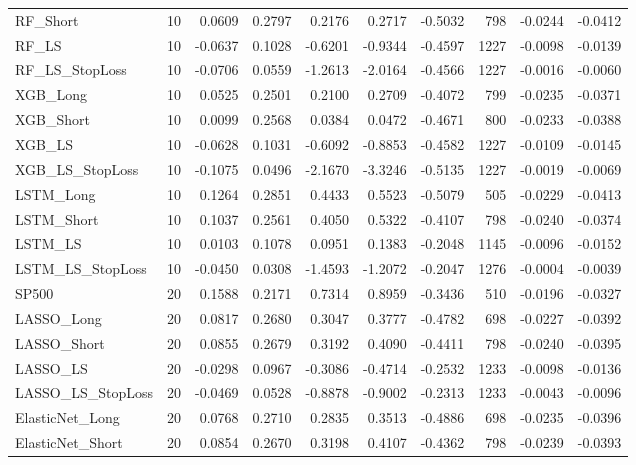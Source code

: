 \begin{tabular}{llrrrrrrrr}
\cline{1-10}
RF\_Short & 10 & 0.0609 & 0.2797 & 0.2176 & 0.2717 & -0.5032 & 798 & -0.0244 & -0.0412 \\
\cline{1-10}
RF\_LS & 10 & -0.0637 & 0.1028 & -0.6201 & -0.9344 & -0.4597 & 1227 & -0.0098 & -0.0139 \\
\cline{1-10}
RF\_LS\_StopLoss & 10 & -0.0706 & 0.0559 & -1.2613 & -2.0164 & -0.4566 & 1227 & -0.0016 & -0.0060 \\
\cline{1-10}
XGB\_Long & 10 & 0.0525 & 0.2501 & 0.2100 & 0.2709 & -0.4072 & 799 & -0.0235 & -0.0371 \\
\cline{1-10}
XGB\_Short & 10 & 0.0099 & 0.2568 & 0.0384 & 0.0472 & -0.4671 & 800 & -0.0233 & -0.0388 \\
\cline{1-10}
XGB\_LS & 10 & -0.0628 & 0.1031 & -0.6092 & -0.8853 & -0.4582 & 1227 & -0.0109 & -0.0145 \\
\cline{1-10}
XGB\_LS\_StopLoss & 10 & -0.1075 & 0.0496 & -2.1670 & -3.3246 & -0.5135 & 1227 & -0.0019 & -0.0069 \\
\cline{1-10}
LSTM\_Long & 10 & 0.1264 & 0.2851 & 0.4433 & 0.5523 & -0.5079 & 505 & -0.0229 & -0.0413 \\
\cline{1-10}
LSTM\_Short & 10 & 0.1037 & 0.2561 & 0.4050 & 0.5322 & -0.4107 & 798 & -0.0240 & -0.0374 \\
\cline{1-10}
LSTM\_LS & 10 & 0.0103 & 0.1078 & 0.0951 & 0.1383 & -0.2048 & 1145 & -0.0096 & -0.0152 \\
\cline{1-10}
LSTM\_LS\_StopLoss & 10 & -0.0450 & 0.0308 & -1.4593 & -1.2072 & -0.2047 & 1276 & -0.0004 & -0.0039 \\
\cline{1-10}
SP500 & 20 & 0.1588 & 0.2171 & 0.7314 & 0.8959 & -0.3436 & 510 & -0.0196 & -0.0327 \\
\cline{1-10}
LASSO\_Long & 20 & 0.0817 & 0.2680 & 0.3047 & 0.3777 & -0.4782 & 698 & -0.0227 & -0.0392 \\
\cline{1-10}
LASSO\_Short & 20 & 0.0855 & 0.2679 & 0.3192 & 0.4090 & -0.4411 & 798 & -0.0240 & -0.0395 \\
\cline{1-10}
LASSO\_LS & 20 & -0.0298 & 0.0967 & -0.3086 & -0.4714 & -0.2532 & 1233 & -0.0098 & -0.0136 \\
\cline{1-10}
LASSO\_LS\_StopLoss & 20 & -0.0469 & 0.0528 & -0.8878 & -0.9002 & -0.2313 & 1233 & -0.0043 & -0.0096 \\
\cline{1-10}
ElasticNet\_Long & 20 & 0.0768 & 0.2710 & 0.2835 & 0.3513 & -0.4886 & 698 & -0.0235 & -0.0396 \\
\cline{1-10}
ElasticNet\_Short & 20 & 0.0854 & 0.2670 & 0.3198 & 0.4107 & -0.4362 & 798 & -0.0239 & -0.0393 \\

\end{tabular}
